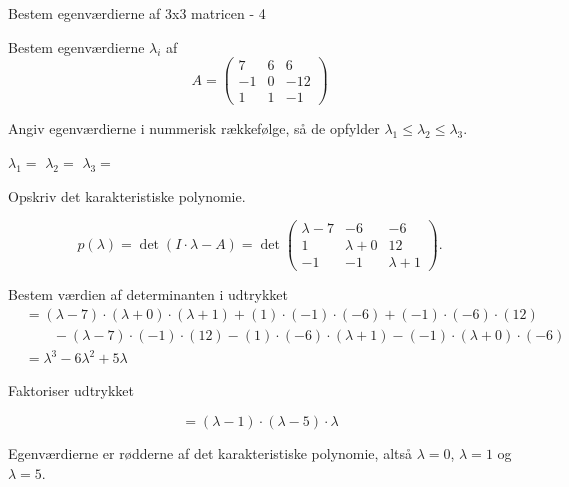 \documentclass{article}
\begin{document}
\begin{exercise}{Bestem egenværdierne af 3x3 matricen - 4}

Bestem egenværdierne $\lambda_i$ af 
\[
A=\begin{pmatrix}
7 & 6 & 6 \\
-1 & 0 & -12 \\
1 & 1 & -1
\end{pmatrix}
\]

Angiv egenværdierne i nummerisk rækkefølge, så de
opfylder $\lambda_1 \le \lambda_2 \le \lambda_3$.

$\lambda_1 = $
$\lambda_2 = $
$\lambda_3 = $

\hint
Opskriv det karakteristiske polynomie.

\hint
\[
p(\lambda)=\det\left(I \cdot \lambda - A \right)=\det\begin{pmatrix}
\lambda - 7 & -6 & -6 \\
1 & \lambda + 0 & 12 \\
-1 & -1 & \lambda + 1
\end{pmatrix}.
\]

\hint
Bestem værdien af determinanten i udtrykket
\begin{align*}
&=(\lambda-7) \cdot (\lambda+0) \cdot (\lambda+1)+(1) \cdot (-1) \cdot (-6)+(-1) \cdot (-6) \cdot (12) \\
&\qquad-(\lambda-7) \cdot (-1) \cdot (12)-(1) \cdot (-6) \cdot (\lambda+1)-(-1) \cdot (\lambda+0) \cdot (-6) \\
&=\lambda^3-6\lambda^2+5\lambda
\end{align*}

\hint
Faktoriser udtrykket

\hint
\[
=(\lambda-1) \cdot (\lambda-5) \cdot \lambda
\]

\hint
Egenværdierne er rødderne af det karakteristiske polynomie, 
altså
$\lambda=0$, $\lambda=1$ og $\lambda=5$.

\end{exercise}
\end{document}
